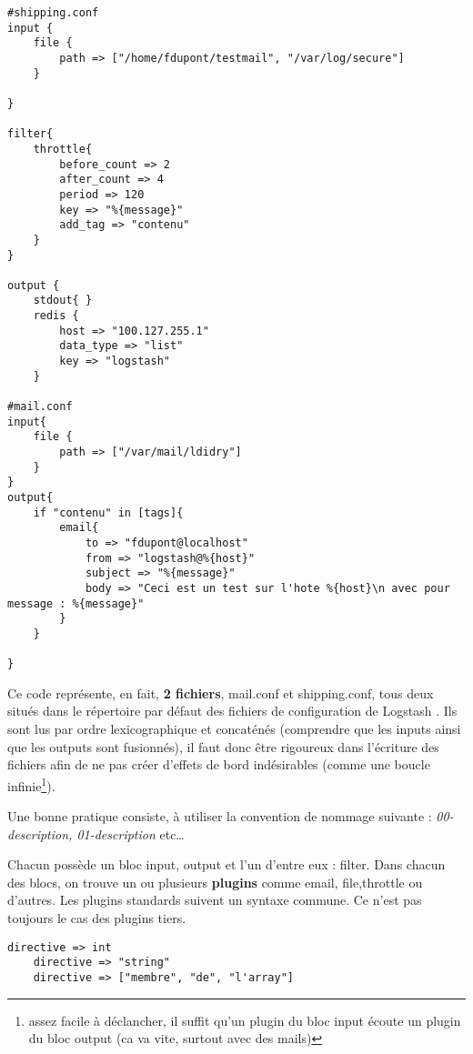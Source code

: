 \begin{lstlisting}[style=logstash,label={lst:conflogstashexample1},caption={Exemple de conf pour mail}]
#shipping.conf
input {
    file {
        path => ["/home/fdupont/testmail", "/var/log/secure"]
    }

}

filter{
    throttle{
        before_count => 2
        after_count => 4
        period => 120
        key => "%{message}"
        add_tag => "contenu"
    }
}

output {
    stdout{ }
    redis {
        host => "100.127.255.1"
        data_type => "list"
        key => "logstash"
    }

#mail.conf
input{
    file {
        path => ["/var/mail/ldidry"]
    }
}
output{
    if "contenu" in [tags]{
        email{
            to => "fdupont@localhost"
            from => "logstash@%{host}"
            subject => "%{message}"
            body => "Ceci est un test sur l'hote %{host}\n avec pour message : %{message}"
        }
    }

}
\end{lstlisting}

Ce code représente, en fait, {\bfseries 2 fichiers}, mail.conf et shipping.conf, tous
deux situés dans le répertoire par défaut des fichiers de configuration de Logstash
. Ils sont lus par ordre lexicographique et concaténés 
(comprendre que les inputs ainsi que les outputs sont fusionnés), il faut donc être
rigoureux dans l'écriture des fichiers afin de ne pas créer d'effets de bord indésirables
(comme une boucle infinie\footnote{assez facile à déclancher, il suffit qu'un plugin
du bloc input écoute un plugin du bloc output (ca va vite, surtout avec des mails)}).

Une bonne pratique consiste, à utiliser la convention de nommage suivante : \textit{
00-description, 01-description} etc\ldots


Chacun possède un bloc input, output et l'un d'entre eux : filter.
Dans chacun des blocs, on trouve un ou plusieurs {\bfseries plugins} comme email, 
file,throttle ou d'autres. 
Les plugins standards suivent un syntaxe commune. Ce n'est pas toujours le cas des
plugins tiers. 

\begin{lstlisting}[style=logstash,label={lst:conflogstashsyntaxe1},caption={Syntaxe}]
    directive => int
    directive => "string"
    directive => ["membre", "de", "l'array"]
\end{lstlisting}

